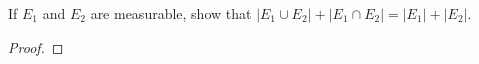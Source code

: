 \begin{problem}
If $E_1$ and $E_2$ are measurable, show that
$\left|E_1\cup E_2\right|+\left|E_1\cap
  E_2\right|=\left|E_1\right|+\left|E_2\right|$.
\end{problem}
\begin{proof}
\end{proof}

